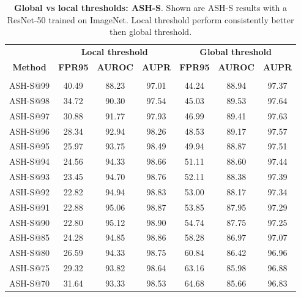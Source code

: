 \documentclass{article}
\newcommand{\tablabel}[1]{\label{tab:#1}}
\begin{document}
\begin{table}[hbt!]
\centering
\begin{tabular}{c c c c | c c c}
             & \multicolumn{3}{c}{\textbf{Local threshold}} & \multicolumn{3}{c}{\textbf{Global threshold}} \\
            \textbf{Method} & \textbf{FPR95} & \textbf{AUROC} & \textbf{AUPR} & \textbf{FPR95} & \textbf{AUROC} & \textbf{AUPR} \\
             &  &  & \multicolumn{1}{c}{} &  &  & \multicolumn{1}{c}{} \\
            \midrule
            ASH-S@99 & 40.49 & 88.23 & 97.01 & 44.24 & 88.94 & 97.37 \\
            ASH-S@98 & 34.72 & 90.30 & 97.54 & 45.03 & 89.53 & 97.64 \\
            ASH-S@97 & 30.88 & 91.77 & 97.93 & 46.99 & 89.41 & 97.63 \\
            ASH-S@96 & 28.34 & 92.94 & 98.26 & 48.53 & 89.17 & 97.57 \\
            ASH-S@95 & 25.97 & 93.75 & 98.49 & 49.94 & 88.87 & 97.51 \\
            ASH-S@94 & 24.56 & 94.33 & 98.66 & 51.11 & 88.60 & 97.44 \\
            ASH-S@93 & 23.45 & 94.70 & 98.76 & 52.11 & 88.38 & 97.39 \\
            ASH-S@92 & 22.82 & 94.94 & 98.83 & 53.00 & 88.17 & 97.34 \\
            ASH-S@91 & 22.88 & 95.06 & 98.87 & 53.85 & 87.95 & 97.29 \\
            ASH-S@90 & 22.80 & 95.12 & 98.90 & 54.74 & 87.75 & 97.25 \\
            ASH-S@85 & 24.28 & 94.85 & 98.86 & 58.28 & 86.97 & 97.07 \\
            ASH-S@80 & 26.59 & 94.33 & 98.75 & 60.84 & 86.42 & 96.96 \\
            ASH-S@75 & 29.32 & 93.82 & 98.64 & 63.16 & 85.98 & 96.88 \\
            ASH-S@70 & 31.64 & 93.33 & 98.53 & 64.68 & 85.66 & 96.83 \\
            \midrule
\end{tabular}
\caption{\textbf{Global vs local thresholds: ASH-S}. Shown are ASH-S results with a ResNet-50 trained on ImageNet. Local threshold perform consistently better then global threshold.} 
\tablabel{ash-s-global}
\end{table}
\end{document}
